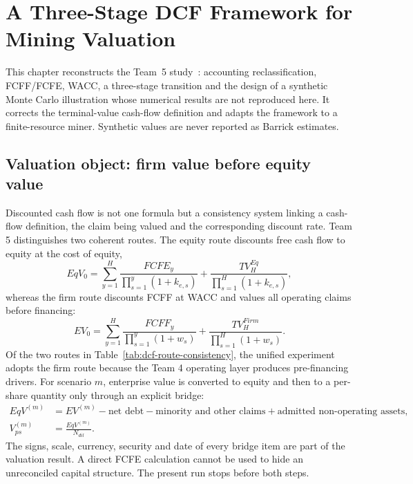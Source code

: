 \chapter{A Three-Stage DCF Framework for Mining Valuation}
\label{ch:dcf}
This chapter reconstructs the Team~5 study~\cite{team5}: accounting reclassification, FCFF/FCFE, WACC, a three-stage transition and the design of a synthetic Monte Carlo illustration whose numerical results are not reproduced here. It corrects the terminal-value cash-flow definition and adapts the framework to a finite-resource miner. Synthetic values are never reported as Barrick estimates.

\section{Valuation object: firm value before equity value}

Discounted cash flow is not one formula but a consistency system linking a
cash-flow definition, the claim being valued and the corresponding discount
rate. Team 5 distinguishes two coherent routes. The equity route discounts
free cash flow to equity at the cost of equity,
\begin{equation}
EqV_0=\sum_{y=1}^{H}\frac{FCFE_y}{\prod_{s=1}^{y}(1+k_{e,s})}
      +\frac{TV_H^{Eq}}{\prod_{s=1}^{H}(1+k_{e,s})},
\end{equation}
whereas the firm route discounts FCFF at WACC and values all operating claims
before financing:
\begin{equation}
EV_0=\sum_{y=1}^{H}\frac{FCFF_y}{\prod_{s=1}^{y}(1+w_s)}
     +\frac{TV_H^{Firm}}{\prod_{s=1}^{H}(1+w_s)}.
\end{equation}
Of the two routes in Table~\ref{tab:dcf-route-consistency}, the unified
experiment adopts the firm route because the Team 4 operating
layer produces pre-financing drivers. For scenario \(m\), enterprise value is
converted to equity and then to a per-share quantity only through an explicit
bridge:
\begin{align}
EqV^{(m)}
  &=EV^{(m)}-\text{net debt}-\text{minority and other claims}
    +\text{admitted non-operating assets},\\
V_{ps}^{(m)}&=\frac{EqV^{(m)}}{N_{dil}}.
\end{align}
The signs, scale, currency, security and date of every bridge item are part of
the valuation result. A direct FCFE calculation cannot be used to hide an
unreconciled capital structure. The present run stops before both steps.

